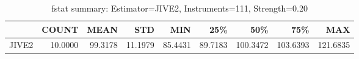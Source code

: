 \begin{table}[ht]
\centering
\caption{fstat summary: Estimator=JIVE2, Instruments=111, Strength=0.20}
\begin{tabular}{lrrrrrrrr}
\toprule
 & COUNT & MEAN & STD & MIN & 25\% & 50\% & 75\% & MAX \\
\midrule
JIVE2 & 10.0000 & 99.3178 & 11.1979 & 85.4431 & 89.7183 & 100.3472 & 103.6393 & 121.6835 \\
\bottomrule
\end{tabular}
\end{table}
